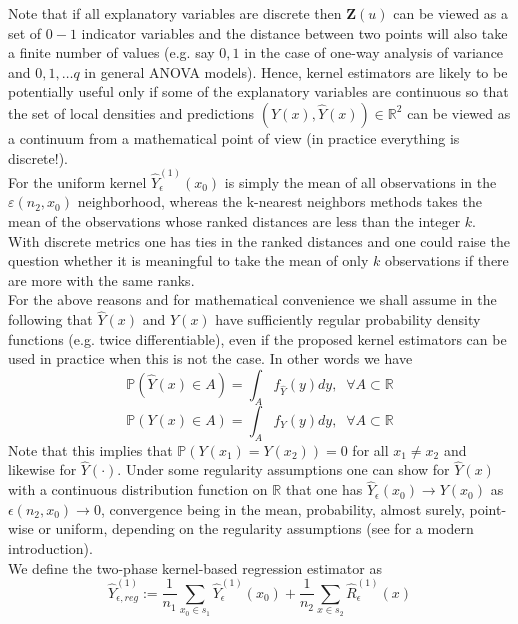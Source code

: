 \documentclass[a4paper,12pt,leqno, titlepage]{article}
\newcommand{\PR}{\mathbb{P}}
\newcommand{\R}{\mathbb{R}}
\begin{document}
Note that if all explanatory variables are discrete then $\pmb{Z}(u)$  can be viewed as a set of $0-1$ indicator variables and the distance between two points will also take a finite number of values (e.g. say $0,1$ in the case of one-way analysis of variance and $0,1,\ldots q$ in general ANOVA models). Hence, kernel estimators are likely to be potentially useful only if some of the explanatory variables are continuous so that the set of local densities and predictions $(Y(x),\hat{Y}(x))\in{\R^2}$ can be viewed as a continuum from a mathematical point of view (in practice everything is discrete!).\\
For the uniform kernel $\hat{Y}^{(1)}_{\epsilon}(x_0)$ is simply the mean of all observations in the $\varepsilon(n_2,x_0)$ neighborhood, whereas the k-nearest neighbors methods takes the mean of the observations whose ranked distances are less than the integer $k$. With discrete metrics one has ties in the ranked distances and one could raise the question whether it is meaningful to take the mean of only $k$ observations if there are more with the same ranks. \\
For the above reasons and for mathematical convenience we shall assume in the following that $\hat{Y}(x)$ and $Y(x)$ have sufficiently regular probability density functions (e.g. twice differentiable), even if the proposed kernel estimators can be used in practice when this is not the case. In other words we have
\begin{equation}\label{regulardensities1}
\PR(\hat{Y}(x)\in{A})=\int_A f_{\hat{Y}}(y)dy, \;\;\forall A\subset \R
\end{equation}
\begin{equation}\label{regulardensities2}
\PR( Y(x)\in{A})=\int_A f_{Y}(y)dy, \;\;\forall A\subset \R
\end{equation}
Note that this implies that $\PR(Y(x_1)=Y(x_2))=0$ for all $x_1 \ne x_2$ and likewise for $\hat{Y}(\cdot)$.
Under some regularity assumptions one can show for $\hat{Y}(x)$ with a continuous distribution function on $\R$ that one has $\hat{Y}_{\epsilon}(x_0)\rightarrow Y(x_0)$ as $\epsilon(n_2,x_0)\rightarrow 0$, convergence being in the mean, probability, almost surely, point-wise or uniform, depending on the regularity assumptions (see \cite{Tsybakov1} for a modern introduction).\\
We define the two-phase kernel-based regression estimator as
\begin{equation}\label{kernelyreg}
\hat{Y}^{(1)}_{\epsilon,reg}:=\frac{1}{n_1}\sum_{x_0\in{s_1}}\hat{Y}^{(1)}_{\epsilon}(x_0)
+\frac{1}{n_2}\sum_{x\in{s_2}}\hat{R}^{(1)}_{\epsilon}(x)
\end{equation}
\end{document}
